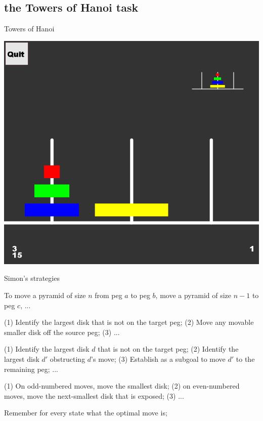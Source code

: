 \documentclass[xcolor=table]{beamer}
\begin{document}
\subsection{the Towers of Hanoi task}

\begin{frame}{Towers of Hanoi}
\centerline{
 \includegraphics[height=.9\textheight]{towersofhanoi.png}}
\end{frame}

\begin{frame}{Simon's strategies}
  \begin{description}[<+->]
  \item[Goal-recursion:] To move a pyramid of size $n$ from peg $a$ to peg $b$, move a pyramid of size $n-1$ to peg $c$, ...
  \item[Perceptual] (1) Identify the largest disk that is not on the target peg; (2) Move any movable smaller disk off the source peg; (3) ...
  \item[Sophisticated Perceptual] (1) Identify the largest disk $d$ that is not on the target peg; (2) Identify the largest disk $d'$ obstructing $d$'s move; (3) Establish as a subgoal to move $d'$ to the remaining peg; ...
  \item[Move-pattern:] (1) On odd-numbered moves, move the smallest disk; (2) on even-numbered moves, move the next-smallest disk that is exposed; (3) ...
  \item[Rote learning:] Remember for every state what the optimal move is;
  \end{description}
\end{frame}
\end{document}
